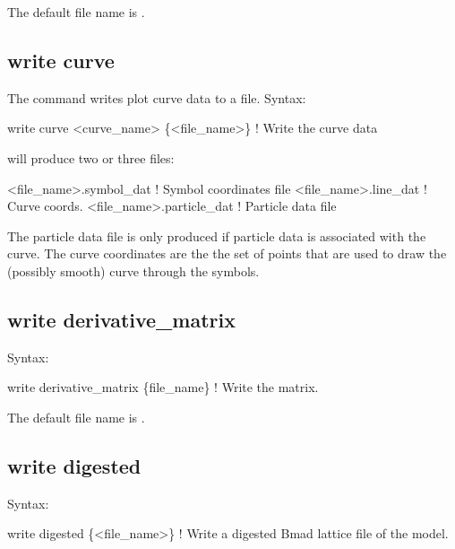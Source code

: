 {{{{{{{{{{{The default file name is .


\subsection{write curve}
\label{s:write.curve}

The  command writes plot curve data to a file.
Syntax:
\begin{example}
    write curve <curve_name> \{<file_name>\} ! Write the curve data
\end{example}

 will produce two or three files:
\begin{example}
  <file_name>.symbol_dat    ! Symbol coordinates file
  <file_name>.line_dat      ! Curve coords.
  <file_name>.particle_dat  ! Particle data file
\end{example}
The particle data file is only produced if particle data is associated with the curve.  The curve
coordinates are the the set of points that are used to draw the (possibly smooth) curve through the
symbols.



\subsection{write derivative_matrix}
\label{s:write.deriv.matrix}

Syntax:
\begin{example}
    write derivative_matrix \{file_name\}    ! Write the  matrix.
\end{example}

The default file name is . 


\subsection{write digested}
\label{s:write.digested}

Syntax:
\begin{example}
    write digested \{<file_name>\}      ! Write a digested Bmad lattice file of the model.
\end{example}

}}}}}}}}}}}
